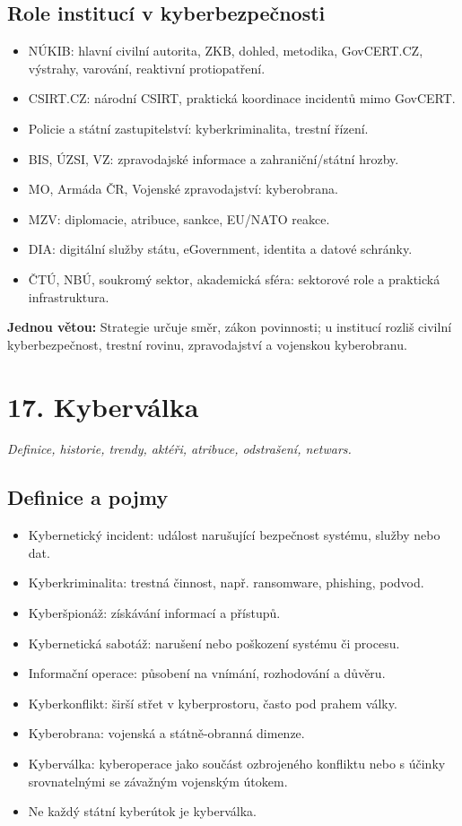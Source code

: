 \documentclass[10pt,a4paper]{article}
\newcommand{\otazka}[2]{\section*{#1}\addcontentsline{toc}{section}{#1}\textit{#2}\par\medskip}
\newcommand{\blok}[1]{\subsection*{#1}}
\newcommand{\mini}[1]{\medskip\noindent\colorbox{blue!7}{\parbox{\dimexpr\linewidth-2\fboxsep}{\textbf{Jednou větou:} #1}}\par\medskip}
\begin{document}
\blok{Role institucí v kyberbezpečnosti}
\begin{itemize}
  \item NÚKIB: hlavní civilní autorita, ZKB, dohled, metodika, GovCERT.CZ, výstrahy, varování, reaktivní protiopatření.
  \item CSIRT.CZ: národní CSIRT, praktická koordinace incidentů mimo GovCERT.
  \item Policie a státní zastupitelství: kyberkriminalita, trestní řízení.
  \item BIS, ÚZSI, VZ: zpravodajské informace a zahraniční/státní hrozby.
  \item MO, Armáda ČR, Vojenské zpravodajství: kyberobrana.
  \item MZV: diplomacie, atribuce, sankce, EU/NATO reakce.
  \item DIA: digitální služby státu, eGovernment, identita a datové schránky.
  \item ČTÚ, NBÚ, soukromý sektor, akademická sféra: sektorové role a praktická infrastruktura.
\end{itemize}

\mini{Strategie určuje směr, zákon povinnosti; u institucí rozliš civilní kyberbezpečnost, trestní rovinu, zpravodajství a vojenskou kyberobranu.}

\newpage

\otazka{17. Kyberválka}{Definice, historie, trendy, aktéři, atribuce, odstrašení, netwars.}

\blok{Definice a pojmy}
\begin{itemize}
  \item Kybernetický incident: událost narušující bezpečnost systému, služby nebo dat.
  \item Kyberkriminalita: trestná činnost, např. ransomware, phishing, podvod.
  \item Kyberšpionáž: získávání informací a přístupů.
  \item Kybernetická sabotáž: narušení nebo poškození systému či procesu.
  \item Informační operace: působení na vnímání, rozhodování a důvěru.
  \item Kyberkonflikt: širší střet v kyberprostoru, často pod prahem války.
  \item Kyberobrana: vojenská a státně-obranná dimenze.
  \item Kyberválka: kyberoperace jako součást ozbrojeného konfliktu nebo s účinky srovnatelnými se závažným vojenským útokem.
  \item Ne každý státní kyberútok je kyberválka.
\end{itemize}
\end{document}
